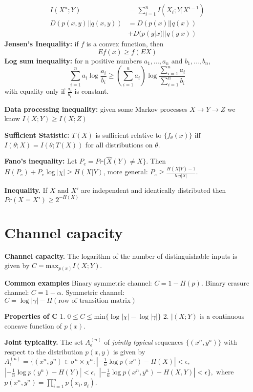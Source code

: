 \documentclass[10pt]{article}
\begin{document}
\begin{tiny}
\begin{multicols}{3}
\begin{align}
I(X^n;Y)&=\sum_{i=1}^n I(X_i;Y|X^{i-1})\\
D(p(x,y)||q(x,y))&=D(p(x)||q(x))\\
&+D(p(y|x)||q(y|x))
\end{align}
{\bf Jensen's Inequality:} if $f$ is a convex function, then
\begin{equation}
Ef(x) \geq f(EX)
\end{equation}
{\bf Log sum inequality:} for n positive numbers $a_1,\ldots,a_n$ and $b_1,\ldots,b_n$,
\begin{equation}
\sum_{i=1}^n a_i \log \frac{a_i}{b_i} \geq \left( \sum_{i=1}^n a_i \right) \log \frac{\sum_{i=1}^n a_i}{\sum_{i=1}^n b_i}
\end{equation}
with equality only if $\frac{a_i}{b_i}$ is constant. 

{\bf Data processing inequality:} given some Markov processes $X\rightarrow Y\rightarrow Z$ we know $I(X;Y)\geq I(X;Z)$

{\bf Sufficient Statistic:} $T(X)$ is sufficient relative to $\{f_\theta (x)\}$ iff $I(\theta;X)=I(\theta;T(X))$ for all distributions on $\theta$.

{\bf Fano's inequality:} Let $P_e=Pr\{\hat{X}(Y)\neq X\}$. Then $H(P_e)+P_e \log |\chi| \geq H(X|Y)$, more general: $P_e \geq \frac{H(X|Y)-1}{log|X|}$.

{\bf Inequality.} If $X$ and $X'$ are independent and identically distributed then $Pr(X=X') \geq 2^{-H(X)}$


\section*{Channel capacity}
{\bf Channel capacity.} The logarithm of the number of distinguishable inputs is given by $ C= \text{max}_{p(x)} I(X;Y).$

{\bf Common examples} Binary symmetric channel: $C= 1 - H(p)$. Binary erasure channel: $C = 1 - \alpha$. Symmetric channel: $C= \log |\gamma | - H(\text{row of transition matrix})$

{\bf Properties of C}  1. $0 \leq C \leq \text{min}\{\log |\chi| - \log | \gamma | \}$  2. $|(X;Y)$ is a continuous concave function of $p(x)$.

{\bf Joint typicality.}  The set $A_{\epsilon}^{(n)}$ of {\it jointly typical} sequences $\{(x^{n},y^{n})\}$ with respect to the distribution $p(x,y)$ is given by $A_{\epsilon}^{(n)} = \{ (x^{n},y^{n}) \in \sigma^{n} \times \chi^{n}: \left| -\frac{1}{n}\log p(x^{n}) - H(X) \right| < \epsilon, $ $\left| -\frac{1}{n}\log p(y^{n}) - H(Y) \right| <\epsilon, $ $\left| -\frac{1}{n} \log p(x^{n},y^{n})-H(X,Y) \right| <\epsilon \}, $ where $p(x^{n},y^{n}) = \prod_{i=1}^{n}p(x_{i},y_{i}).$



\end{multicols}
\end{tiny}
\end{document}
